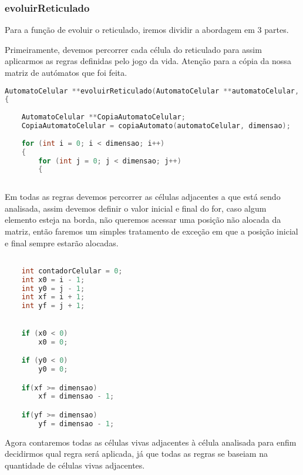 \documentclass{article}
\begin{document}
\subsubsection{evoluirReticulado}

Para a função de evoluir o reticulado, iremos dividir a abordagem em 3 partes.

Primeiramente, devemos percorrer cada célula do reticulado	para assim aplicarmos as regras definidas pelo jogo da vida.
Atenção para a cópia da nossa matriz de autómatos que foi feita.

\begin{lstlisting}[caption={Função evoluirReticulado parte 1},label={lst:cod7},language=C]
AutomatoCelular **evoluirReticulado(AutomatoCelular **automatoCelular, int dimensao)
{
    
    AutomatoCelular **CopiaAutomatoCelular;
    CopiaAutomatoCelular = copiaAutomato(automatoCelular, dimensao);
    
    for (int i = 0; i < dimensao; i++)
    {
        for (int j = 0; j < dimensao; j++)
        {
    
\end{lstlisting}

Em todas as regras devemos percorrer as células adjacentes a que está sendo analisada, assim devemos definir o valor inicial e final do for, caso algum elemento esteja na borda, não queremos acessar uma posição não alocada da matriz, então faremos um simples tratamento de exceção em que a posição inicial e final sempre estarão alocadas.

\begin{lstlisting}[caption={Função evoluirReticulado parte 2},label={lst:cod8},language=C]

    int contadorCelular = 0;
    int x0 = i - 1;
    int y0 = j - 1;
    int xf = i + 1;
    int yf = j + 1;

    
    if (x0 < 0) 
        x0 = 0;

    if (y0 < 0) 
        y0 = 0;

    if(xf >= dimensao)
        xf = dimensao - 1;

    if(yf >= dimensao)
        yf = dimensao - 1;


\end{lstlisting}

Agora contaremos todas as células vivas adjacentes à célula analisada para enfim decidirmos qual regra será aplicada, já que todas as regras se baseiam na quantidade de células vivas adjacentes.
\end{document}
